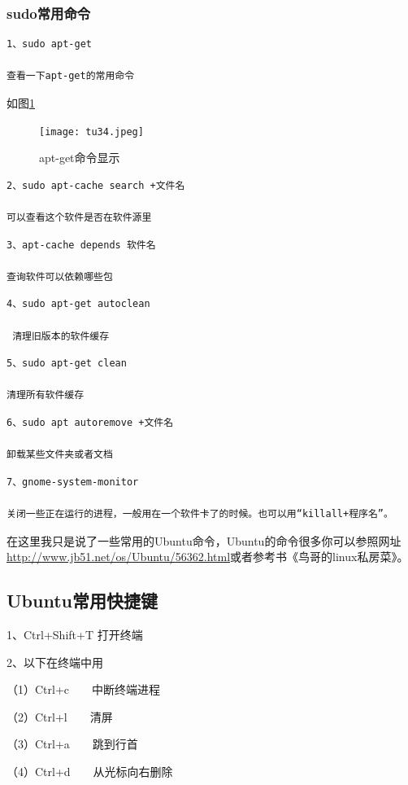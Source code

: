 \documentclass{article}
\begin{document}
\subsubsection{sudo常用命令}
\begin{lstlisting}
1、sudo apt-get

查看一下apt-get的常用命令
\end{lstlisting}
如图\ref{tu34}
\begin{figure}[!htb] %
\centering
\texttt{[image: tu34.jpeg]}
\caption{\small apt-get命令显示}
\label{tu34}
\end{figure} 
\begin{lstlisting}
2、sudo apt-cache search +文件名

可以查看这个软件是否在软件源里
\end{lstlisting}
\begin{lstlisting}
3、apt-cache depends 软件名

查询软件可以依赖哪些包
\end{lstlisting}
\begin{lstlisting}
4、sudo apt-get autoclean

 清理旧版本的软件缓存
\end{lstlisting}
\begin{lstlisting}
5、sudo apt-get clean

清理所有软件缓存
\end{lstlisting}
\begin{lstlisting}
6、sudo apt autoremove +文件名

卸载某些文件夹或者文档
\end{lstlisting}
\begin{lstlisting}
7、gnome-system-monitor

关闭一些正在运行的进程，一般用在一个软件卡了的时候。也可以用“killall+程序名”。
\end{lstlisting}
在这里我只是说了一些常用的Ubuntu命令，Ubuntu的命令很多你可以参照网址\url{http://www.jb51.net/os/Ubuntu/56362.html}或者参考书{\color{red}《鸟哥的linux私房菜》}。
\subsection{Ubuntu常用快捷键}
1、Ctrl+Shift+T 打开终端

2、以下在终端中用

  （1）Ctrl+c~~~~中断终端进程

  （2）Ctrl+l~~~~清屏

 （3）Ctrl+a~~~~跳到行首

 （4）Ctrl+d~~~~从光标向右删除
\end{document}
